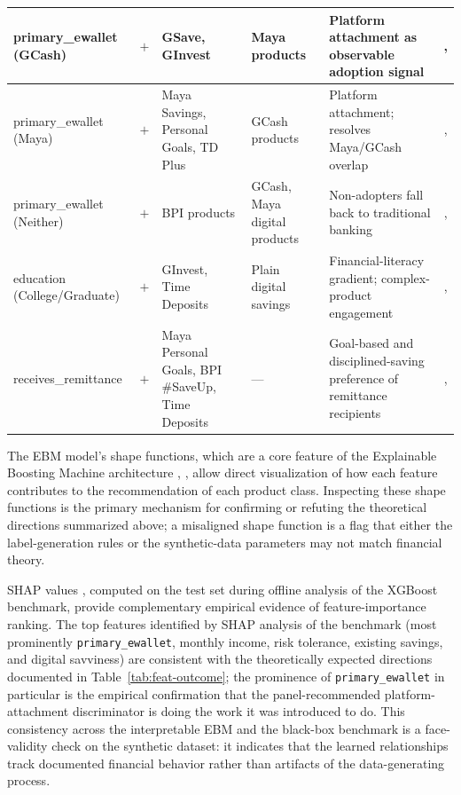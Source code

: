 \documentclass[journal]{./IEEE/IEEEtran}
\begin{document}
\begin{table}[t]
\begin{tabular}{|l|p{1.3cm}|p{3.5cm}|p{3.0cm}|p{3.5cm}|c|}
        \hline
        primary\_ewallet (GCash) & $+$ & GSave, GInvest & Maya products & Platform attachment as observable adoption signal & \cite{ref9}, \cite{ref35} \\
        \hline
        primary\_ewallet (Maya) & $+$ & Maya Savings, Personal Goals, TD Plus & GCash products & Platform attachment; resolves Maya/GCash overlap & \cite{ref9}, \cite{ref35} \\
        \hline
        primary\_ewallet (Neither) & $+$ & BPI products & GCash, Maya digital products & Non-adopters fall back to traditional banking & \cite{ref35}, \cite{ref66} \\
        \hline
        education (College/Graduate) & $+$ & GInvest, Time Deposits & Plain digital savings & Financial-literacy gradient; complex-product engagement & \cite{ref43}, \cite{ref41} \\
        \hline
        receives\_remittance & $+$ & Maya Personal Goals, BPI \#SaveUp, Time Deposits & --- & Goal-based and disciplined-saving preference of remittance recipients & \cite{ref40}, \cite{ref63} \\
        \hline
    \end{tabular}
\end{table}

The EBM model's shape functions, which are a core feature of the Explainable Boosting Machine architecture \cite{ref48}, \cite{ref49}, allow direct visualization of how each feature contributes to the recommendation of each product class. Inspecting these shape functions is the primary mechanism for confirming or refuting the theoretical directions summarized above; a misaligned shape function is a flag that either the label-generation rules or the synthetic-data parameters may not match financial theory.

SHAP values \cite{ref18}, computed on the test set during offline analysis of the XGBoost benchmark, provide complementary empirical evidence of feature-importance ranking. The top features identified by SHAP analysis of the benchmark (most prominently \texttt{primary\_ewallet}, monthly income, risk tolerance, existing savings, and digital savviness) are consistent with the theoretically expected directions documented in Table~\ref{tab:feat-outcome}; the prominence of \texttt{primary\_ewallet} in particular is the empirical confirmation that the panel-recommended platform-attachment discriminator is doing the work it was introduced to do. This consistency across the interpretable EBM and the black-box benchmark is a face-validity check on the synthetic dataset: it indicates that the learned relationships track documented financial behavior rather than artifacts of the data-generating process.
\end{document}
